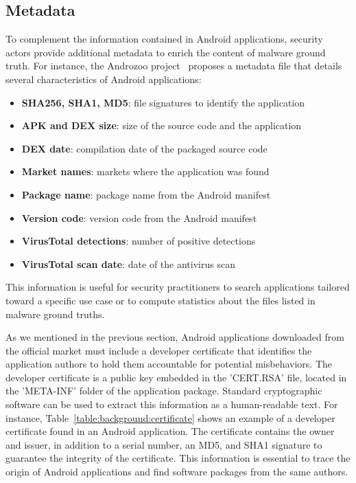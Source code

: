 \subsection{Metadata}
To complement the information contained in Android applications, security actors provide additional metadata to enrich the content of malware ground truth.
For instance, the Androzoo project~\cite{allix_androzoo:_2016} proposes a metadata file that details several characteristics of Android applications:

\begin{itemize}
  \item \textbf{SHA256, SHA1, MD5}: file signatures to identify the application
  \item \textbf{APK and DEX size}: size of the source code and the application
  \item \textbf{DEX date}: compilation date of the packaged source code
  \item \textbf{Market names}: markets where the application was found
  \item \textbf{Package name}: package name from the Android manifest
  \item \textbf{Version code}: version code from the Android manifest
  \item \textbf{VirusTotal detections}: number of positive detections
  \item \textbf{VirusTotal scan date}: date of the antivirus scan
\end{itemize}

This information is useful for security practitioners to search applications tailored toward a specific use case or to compute statistics about the files listed in malware ground truths.



As we mentioned in the previous section, Android applications downloaded from the official market must include a developer certificate that identifies the application authors to hold them accountable for potential misbehaviors.
The developer certificate is a public key embedded in the 'CERT.RSA' file, located in the 'META-INF' folder of the application package.
Standard cryptographic software can be used to extract this information as a human-readable text.
For instance, Table~\ref{table:background:certificate} shows an example of a developer certificate found in an Android application.
The certificate contains the owner and issuer, in addition to a serial number, an MD5, and SHA1 signature to guarantee the integrity of the certificate.
This information is essential to trace the origin of Android applications and find software packages from the same authors.

